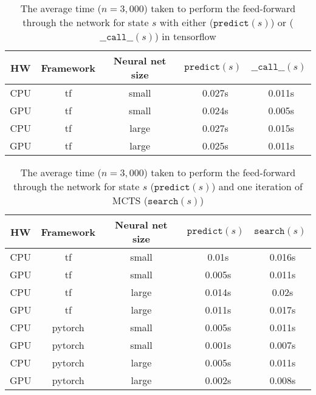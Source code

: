 \begin{table*}
    \begin{center}
        \begin{tabular}{ c|c|c|c|c }
            HW  & Framework & Neural net size & $\texttt{predict}(s)$ & $\texttt{\_\_call\_\_}(s)$ \\
            \hline
            \hline
            CPU & tf        & small           & ~0.027s               & ~0.011s                    \\
            GPU & tf        & small           & ~0.024s               & ~0.005s                    \\
            CPU & tf        & large           & ~0.027s               & ~0.015s                    \\
            GPU & tf        & large           & ~0.025s               & ~0.011s                    \\
        \end{tabular}
    \end{center}
    \caption{The average time ($n = 3,000$) taken to perform the feed-forward through the network for state $s$ with either ($\texttt{predict}(s)$) or ($\texttt{\_\_call\_\_}(s)$) in tensorflow}\label{tensorflow_predict_vs_call}
\end{table*}

\begin{table*}
    \begin{center}
        \begin{tabular}{ c|c|c|c|c }
            HW  & Framework & Neural net size & $\texttt{predict}(s)$ & $\texttt{search}(s)$ \\
            \hline
            \hline
            CPU & tf        & small           & ~0.01s                & ~0.016s              \\
            GPU & tf        & small           & ~0.005s               & ~0.011s              \\
            CPU & tf        & large           & ~0.014s               & ~0.02s               \\
            GPU & tf        & large           & ~0.011s               & ~0.017s              \\
            CPU & pytorch   & small           & ~0.005s               & ~0.011s              \\
            GPU & pytorch   & small           & ~0.001s               & ~0.007s              \\
            CPU & pytorch   & large           & ~0.005s               & ~0.011s              \\
            GPU & pytorch   & large           & ~0.002s               & ~0.008s              \\
        \end{tabular}
    \end{center}
    \caption{The average time ($n = 3,000$) taken to perform the feed-forward through the network for state $s$ ($\texttt{predict}(s)$) and one iteration of MCTS ($\texttt{search}(s)$)}\label{pytorch_vs_tensorflow_performance}
\end{table*}

